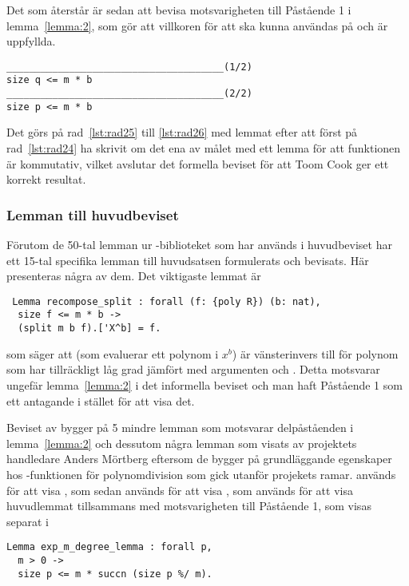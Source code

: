 Det som återstår är sedan att bevisa motsvarigheten till Påstående 1 i
lemma~\ref{lemma:2}, som gör att villkoren för att  ska
kunna användas på  och  är uppfyllda.
\begin{lstlisting}
______________________________________(1/2)
size q <= m * b
______________________________________(2/2)
size p <= m * b
\end{lstlisting}
Det görs på rad~\ref{lst:rad25} till \ref{lst:rad26} med lemmat
 efter att först på rad~\ref{lst:rad24} ha skrivit om det ena
av målet med ett lemma för att funktionen  är kommutativ, vilket
avslutar det formella beviset för att Toom Cook ger ett korrekt resultat.

\subsubsection{Lemman till huvudbeviset}
Förutom de 50-tal lemman ur \ssr{}-biblioteket som har används i huvudbeviset har
ett 15-tal specifika lemman till huvudsatsen formulerats och bevisats. Här
presenteras några av dem. Det viktigaste lemmat är
\begin{lstlisting}
 Lemma recompose_split : forall (f: {poly R}) (b: nat),
  size f <= m * b ->
  (split m b f).['X^b] = f.
\end{lstlisting}
som säger att  (som evaluerar ett polynom i $x^b$) är
vänsterinvers till  för polynom som har tillräckligt låg grad jämfört
med argumenten  och . Detta motsvarar ungefär lemma~\ref{lemma:2} i
det informella beviset och man haft Påstående 1 som ett antagande i stället för
att visa det.

Beviset av  bygger på 5 mindre lemman som motsvarar
delpåståenden i lemma~\ref{lemma:2} och dessutom några lemman som visats av
projektets handledare Anders Mörtberg eftersom de bygger på grundläggande
egenskaper hos \ssr{}-funktionen  för polynomdivision som gick utanför
projekets ramar.
 används för att visa , som
sedan används för att visa , som används för att visa
huvudlemmat tillsammans med motsvarigheten till Påstående 1, som visas separat
i
\begin{lstlisting}
Lemma exp_m_degree_lemma : forall p,
  m > 0 ->
  size p <= m * succn (size p %/ m).
\end{lstlisting}

